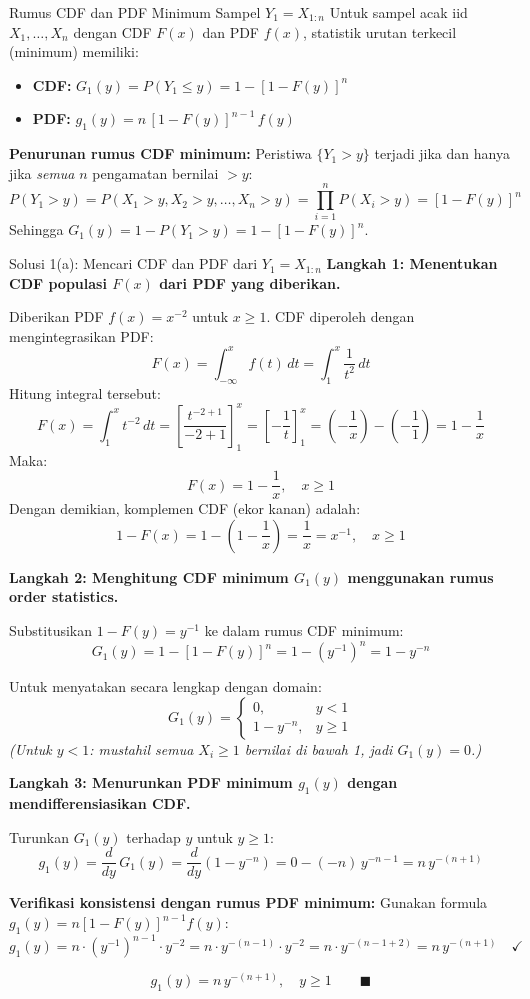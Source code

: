 \documentclass[10pt,twoside]{article}
\begin{document}
\begin{tipbox}{Rumus CDF dan PDF Minimum Sampel $Y_1 = X_{1:n}$}
Untuk sampel acak iid $X_1, \dots, X_n$ dengan CDF $F(x)$ dan PDF $f(x)$, statistik urutan terkecil (minimum) memiliki:
\begin{itemize}
  \item \textbf{CDF:} $G_1(y) = P(Y_1 \le y) = 1 - [1 - F(y)]^n$
  \item \textbf{PDF:} $g_1(y) = n\,[1 - F(y)]^{n-1}\,f(y)$
\end{itemize}
\textbf{Penurunan rumus CDF minimum:} Peristiwa $\{Y_1 > y\}$ terjadi jika dan hanya jika \textit{semua} $n$ pengamatan bernilai $> y$:
\[
P(Y_1 > y) = P(X_1 > y, X_2 > y, \dots, X_n > y) = \prod_{i=1}^n P(X_i > y) = [1-F(y)]^n
\]
Sehingga $G_1(y) = 1 - P(Y_1 > y) = 1 - [1-F(y)]^n$.
\end{tipbox}

\begin{solbox}{Solusi 1(a): Mencari CDF dan PDF dari $Y_1 = X_{1:n}$}
\textbf{Langkah 1: Menentukan CDF populasi $F(x)$ dari PDF yang diberikan.}

Diberikan PDF $f(x) = x^{-2}$ untuk $x \ge 1$. CDF diperoleh dengan mengintegrasikan PDF:
\[
F(x) = \int_{-\infty}^{x} f(t)\,dt = \int_1^x \frac{1}{t^2}\,dt
\]
Hitung integral tersebut:
\[
F(x) = \int_1^x t^{-2}\,dt = \left[\frac{t^{-2+1}}{-2+1}\right]_1^x = \left[-\frac{1}{t}\right]_1^x = \left(-\frac{1}{x}\right) - \left(-\frac{1}{1}\right) = 1 - \frac{1}{x}
\]
Maka:
\[
\boxed{F(x) = 1 - \frac{1}{x}, \quad x \ge 1}
\]
Dengan demikian, komplemen CDF (ekor kanan) adalah:
\[
1 - F(x) = 1 - \left(1 - \frac{1}{x}\right) = \frac{1}{x} = x^{-1}, \quad x \ge 1
\]

\textbf{Langkah 2: Menghitung CDF minimum $G_1(y)$ menggunakan rumus order statistics.}

Substitusikan $1 - F(y) = y^{-1}$ ke dalam rumus CDF minimum:
\[
G_1(y) = 1 - [1 - F(y)]^n = 1 - \left(y^{-1}\right)^n = 1 - y^{-n}
\]

Untuk menyatakan secara lengkap dengan domain:
\[
\boxed{G_1(y) = \begin{cases} 0, & y < 1 \\ 1 - y^{-n}, & y \ge 1 \end{cases}}
\]
\textit{(Untuk $y < 1$: mustahil semua $X_i \ge 1$ bernilai di bawah 1, jadi $G_1(y) = 0$.)
}

\textbf{Langkah 3: Menurunkan PDF minimum $g_1(y)$ dengan mendifferensiasikan CDF.}

Turunkan $G_1(y)$ terhadap $y$ untuk $y \ge 1$:
\[
g_1(y) = \frac{d}{dy}\,G_1(y) = \frac{d}{dy}\left(1 - y^{-n}\right) = 0 - (-n)\,y^{-n-1} = n\,y^{-(n+1)}
\]

\textbf{Verifikasi konsistensi dengan rumus PDF minimum:}
Gunakan formula $g_1(y) = n[1-F(y)]^{n-1} f(y)$:
\[
g_1(y) = n \cdot (y^{-1})^{n-1} \cdot y^{-2} = n \cdot y^{-(n-1)} \cdot y^{-2} = n \cdot y^{-(n-1+2)} = n\,y^{-(n+1)} \quad \checkmark
\]

\[
\boxed{g_1(y) = n\,y^{-(n+1)}, \quad y \ge 1} \qquad \blacksquare
\]
\end{solbox}
\end{document}
